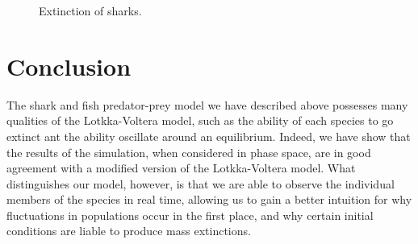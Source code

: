 \documentclass[aps,prl,preprint,superscriptaddress]{revtex4}
\begin{document}
\begin{figure}[H]
	\centering
	\caption{Extinction of sharks.}
	\label{more_clusters} 
\end{figure}
 
\section{Conclusion}
The shark and fish predator-prey model we have described above possesses many qualities of the Lotkka-Voltera model, such as the ability of each species to go extinct ant the ability oscillate around an equilibrium. Indeed, we have show that the results of the simulation, when considered in phase space, are in good agreement with a modified version of the Lotkka-Voltera model. What distinguishes our model, however, is that we are able to observe the individual members of the species in real time, allowing us to gain a better intuition for why fluctuations in populations occur in the first place, and why certain initial conditions are liable to produce mass extinctions. 
  
\end{document}
